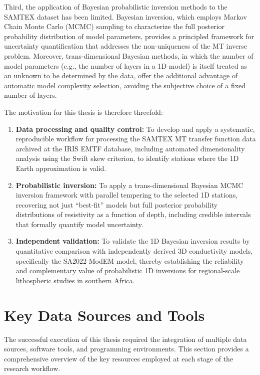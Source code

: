 Third, the application of Bayesian probabilistic inversion methods to the SAMTEX dataset has been limited. Bayesian inversion, which employs Markov Chain Monte Carlo (MCMC) sampling to characterize the full posterior probability distribution of model parameters, provides a principled framework for uncertainty quantification that addresses the non-uniqueness of the MT inverse problem. Moreover, trans-dimensional Bayesian methods, in which the number of model parameters (e.g., the number of layers in a 1D model) is itself treated as an unknown to be determined by the data, offer the additional advantage of automatic model complexity selection, avoiding the subjective choice of a fixed number of layers.

The motivation for this thesis is therefore threefold:

\begin{enumerate}
    \item \textbf{Data processing and quality control:} To develop and apply a systematic, reproducible workflow for processing the SAMTEX MT transfer function data archived at the IRIS EMTF database, including automated dimensionality analysis using the Swift skew criterion, to identify stations where the 1D Earth approximation is valid.

    \item \textbf{Probabilistic inversion:} To apply a trans-dimensional Bayesian MCMC inversion framework with parallel tempering to the selected 1D stations, recovering not just ``best-fit'' models but full posterior probability distributions of resistivity as a function of depth, including credible intervals that formally quantify model uncertainty.

    \item \textbf{Independent validation:} To validate the 1D Bayesian inversion results by quantitative comparison with independently derived 3D conductivity models, specifically the SA2022 ModEM model, thereby establishing the reliability and complementary value of probabilistic 1D inversions for regional-scale lithospheric studies in southern Africa.
\end{enumerate}


\section*{Key Data Sources and Tools}

The successful execution of this thesis required the integration of multiple data sources, software tools, and programming environments. This section provides a comprehensive overview of the key resources employed at each stage of the research workflow.

